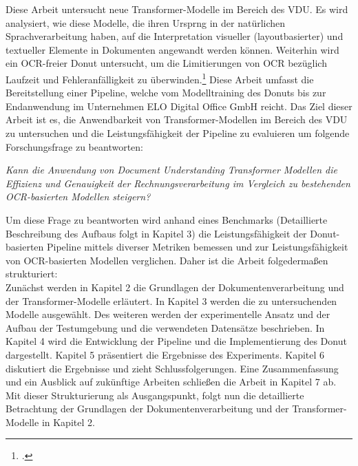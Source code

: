 Diese Arbeit untersucht neue Transformer-Modelle im Bereich des VDU. Es wird analysiert, wie diese Modelle, die ihren Ursprng in der natürlichen Sprachverarbeitung haben, auf die Interpretation visueller (layoutbasierter) und textueller Elemente in Dokumenten angewandt werden können. Weiterhin wird ein OCR-freier \ac{Donut} untersucht, um die Limitierungen von OCR bezüglich Laufzeit und Fehleranfälligkeit zu überwinden.\footcites[Vgl.][S. 1]{kim_ocr-free_2021} Diese Arbeit umfasst die Bereitstellung einer Pipeline, welche vom Modelltraining des Donuts bis zur Endanwendung im Unternehmen ELO Digital Office GmbH reicht. 
Das Ziel dieser Arbeit ist es, die Anwendbarkeit von Transformer-Modellen im Bereich des \ac{VDU} zu untersuchen und die Leistungsfähigkeit der Pipeline zu evaluieren um folgende Forschungsfrage zu beantworten:
\begin{center}
    \emph{Kann die Anwendung von Document Understanding Transformer Modellen die Effizienz und Genauigkeit der Rechnungsverarbeitung im Vergleich zu bestehenden OCR-basierten Modellen steigern?}
\end{center} 
Um diese Frage zu beantworten wird anhand eines Benchmarks (Detaillierte Beschreibung des Aufbaus folgt in Kapitel 3) die Leistungsfähigkeit der Donut-basierten Pipeline mittels diverser Metriken bemessen und zur Leistungsfähigkeit von OCR-basierten Modellen verglichen. Daher ist die Arbeit folgedermaßen strukturiert: \\Zunächst werden in Kapitel 2 die Grundlagen der Dokumentenverarbeitung und der Transformer-Modelle erläutert. In Kapitel 3 werden die zu untersuchenden Modelle ausgewählt. Des weiteren werden der experimentelle Ansatz und der Aufbau der Testumgebung und die verwendeten Datensätze beschrieben. In Kapitel 4 wird die Entwicklung der Pipeline und die Implementierung des Donut dargestellt. Kapitel 5 präsentiert die Ergebnisse des Experiments. Kapitel 6 diskutiert die Ergebnisse und zieht Schlussfolgerungen. Eine Zusammenfassung und ein Ausblick auf zukünftige Arbeiten schließen die Arbeit in Kapitel 7 ab. Mit dieser Strukturierung als Ausgangspunkt, folgt nun die detaillierte Betrachtung der Grundlagen der Dokumentenverarbeitung und der Transformer-Modelle in Kapitel 2.
